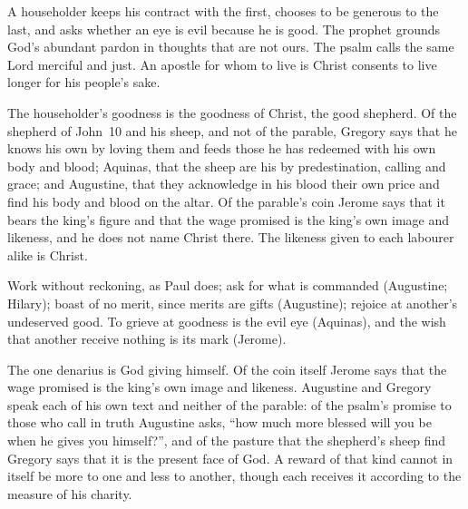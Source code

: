 \begin{fourSenses}
\item[Literal.] A householder keeps his contract with the first, chooses to be
generous to the last, and asks whether an eye is evil because he is good. The
prophet grounds God's abundant pardon in thoughts that are not ours. The psalm
calls the same Lord merciful and just. An apostle for whom to live is Christ
consents to live longer for his people's sake.

\item[Allegorical.] The householder's goodness is the goodness of Christ, the
good shepherd. Of the shepherd of John~10 and his sheep, and not of the
parable, Gregory says that he knows his own by loving them and feeds those he
has redeemed with his own body and blood; Aquinas, that the sheep are his by
predestination, calling and grace; and Augustine, that they acknowledge in his
blood their own price and find his body and blood on the altar. Of the
parable's coin Jerome says that it bears the king's figure and that the wage
promised is the king's own image and likeness, and he does not name Christ
there. The likeness given to each labourer alike is Christ.

\item[Moral.] Work without reckoning, as Paul does; ask for what is commanded
(Augustine; Hilary); boast of no merit, since merits are gifts (Augustine);
rejoice at another's undeserved good. To grieve at goodness is the evil eye
(Aquinas), and the wish that another receive nothing is its mark (Jerome).

\item[Anagogical.] The one denarius is God giving himself. Of the coin itself
Jerome says that the wage promised is the king's own image and likeness.
Augustine and Gregory speak each of his own text and neither of the parable:
of the psalm's promise to those who call in truth Augustine asks, ``how much
more blessed will you be when he gives you himself?'', and of the pasture that
the shepherd's sheep find Gregory says that it is the present face of God. A
reward of that kind cannot in itself be more to one and less to another,
though each receives it according to the measure of his charity.
\end{fourSenses}
